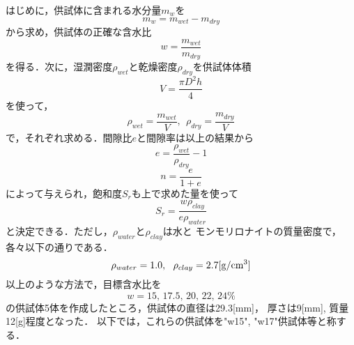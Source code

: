 はじめに，供試体に含まれる水分量$m_w$を
\begin{equation}
	m_w=m_{wet}-m_{dry}
	\label{eqn:}
\end{equation}
から求め，供試体の正確な含水比
\begin{equation}
	w=\frac{m_{wet}}{m_{dry}}
	\label{eqn:water_content}
\end{equation}
を得る．次に，湿潤密度$\rho_{wet}$と乾燥密度$\rho_{dry}$を供試体体積
\begin{equation}
	V=\frac{\pi D^2h}{4}
	\label{eqn:}
\end{equation}
を使って，
\begin{equation}
	\rho_{wet}=\frac{m_{wet}}{V}, \ \ 
	\rho_{dry}=\frac{m_{dry}}{V}
	\label{eqn:}
\end{equation}
で，それぞれ求める．間隙比$e$と間隙率は以上の結果から
\begin{equation}
	e=\frac{\rho_{wet}}{\rho_{dry}} -1
	\label{eqn:}
\end{equation}
\begin{equation}
	n=\frac{e}{1+e}
	\label{eqn:}
\end{equation}
によって与えられ，飽和度$S_r$も上で求めた量を使って
\begin{equation}
	S_r=\frac{w\rho_{clay}}{e\rho_{water}}
	\label{eqn:}
\end{equation}
と決定できる．ただし，$\rho_{water}$と$\rho_{clay}$は水と
モンモリロナイトの質量密度で，各々以下の通りである．
\begin{equation}
	\rho_{water}=1.0, \ \ \rho_{clay}=2.7 {\rm [g/cm^3]}
	\label{eqn:}
\end{equation}
以上のような方法で，目標含水比を
\[
	w=15,\, 17.5,\, 20,\, 22,\, 24\%
\]
の供試体5体を作成したところ，供試体の直径は29.3[mm]，
厚さは9[mm], 質量12[g]程度となった．
以下では，これらの供試体を"w15", "w17"供試体等と称する．
